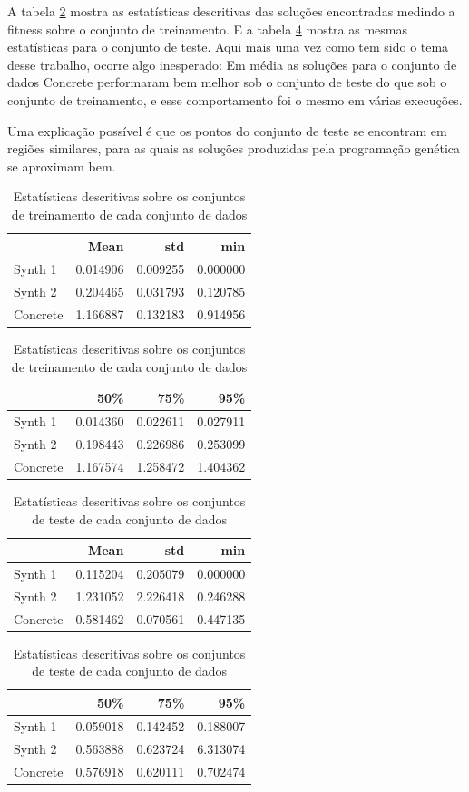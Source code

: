 \documentclass[10pt,twocolumn,letterpaper]{article}
\begin{document}
A tabela \ref{tab:train} mostra as estatísticas descritivas das soluções encontradas medindo a fitness sobre o conjunto de treinamento. E a tabela \ref{tab:test} mostra as mesmas estatísticas para o conjunto de teste. Aqui mais uma vez como tem sido o tema desse trabalho, ocorre algo inesperado: Em média as soluções para o conjunto de dados Concrete performaram bem melhor sob o conjunto de teste do que sob o conjunto de treinamento, e esse comportamento foi o mesmo em várias execuções.

Uma explicação possível é que os pontos do conjunto de teste se encontram em regiões similares, para as quais as soluções produzidas pela programação genética se aproximam bem.

\begin{table}[h]
   \caption{Estatísticas descritivas sobre os conjuntos de treinamento de cada conjunto de dados}
\centering
\begin{tabular}{|l|r|r|r|}
   \hline
   & Mean & std & min \\
   \hline
   Synth 1 & 0.014906 & 0.009255 & 0.000000 \\
   Synth 2 & 0.204465 & 0.031793 & 0.120785 \\
   Concrete & 1.166887 & 0.132183 & 0.914956 \\
  \hline
\end{tabular}

\begin{tabular}{|l|r|r|r|}
   \hline
   & 50\% & 75\% & 95\% \\
   \hline
   Synth 1 & 0.014360 & 0.022611 & 0.027911 \\
   Synth 2 & 0.198443 & 0.226986 & 0.253099 \\
   Concrete & 1.167574 & 1.258472 & 1.404362 \\
  \hline
\end{tabular}
\label{tab:train}
\end{table}


\begin{table}[h]
   \caption{Estatísticas descritivas sobre os conjuntos de teste de cada conjunto de dados}
\centering
\begin{tabular}{|l|r|r|r|}
   \hline
   & Mean & std & min \\
   \hline
   Synth 1 & 0.115204 & 0.205079 & 0.000000 \\
   Synth 2 & 1.231052 & 2.226418 & 0.246288 \\
   Concrete & 0.581462 & 0.070561 & 0.447135 \\
  \hline
\end{tabular}

\begin{tabular}{|l|r|r|r|}
   \hline
   & 50\% & 75\% & 95\% \\
   \hline
   Synth 1 & 0.059018 & 0.142452 & 0.188007 \\
   Synth 2 & 0.563888 & 0.623724 & 6.313074 \\
   Concrete & 0.576918 & 0.620111 & 0.702474 \\
  \hline
\end{tabular}
\label{tab:test}
\end{table}
\end{document}
